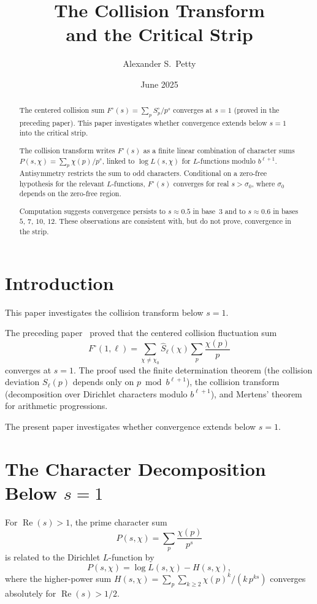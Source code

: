 \documentclass[12pt]{amsart}
\title{The Collision Transform\\and the Critical Strip}
\author{Alexander S.\ Petty}
\date{June 2025}
\theoremstyle{definition}
\theoremstyle{remark}
\begin{document}
\begin{abstract}
The centered collision sum
$F^{\circ}(s) = \sum_p S^{\circ}_p / p^s$
converges at $s = 1$ (proved in the preceding paper).
This paper investigates whether convergence extends
below $s = 1$ into the critical strip.

The collision transform writes $F^{\circ}(s)$ as a
finite linear combination of character sums
$P(s, \chi) = \sum_p \chi(p)/p^s$, linked to
$\log L(s, \chi)$ for $L$-functions modulo
$b^{\ell+1}$. Antisymmetry restricts the sum to odd
characters. Conditional on a zero-free hypothesis for
the relevant $L$-functions, $F^{\circ}(s)$ converges
for real $s > \sigma_0$, where $\sigma_0$ depends on
the zero-free region.

Computation suggests convergence persists to
$s \approx 0.5$ in base~$3$ and to $s \approx 0.6$
in bases $5$, $7$, $10$, $12$. These observations
are consistent with, but do not prove, convergence
in the strip.
\end{abstract}
\maketitle

\section{Introduction}

This paper investigates the collision transform below $s = 1$.

The preceding paper~\cite{paper16} proved that the centered
collision fluctuation sum
\[
F^{\circ}(1, \ell)
= \sum_{\chi \ne \chi_0}
\hat{S}_{\ell}(\chi) \sum_p \frac{\chi(p)}{p}
\]
converges at $s = 1$. The proof used the finite determination
theorem (the collision deviation $S_{\ell}(p)$ depends only on
$p \bmod b^{\ell+1}$), the collision transform (decomposition
over Dirichlet characters modulo $b^{\ell+1}$), and Mertens'
theorem for arithmetic progressions.

The present paper investigates whether convergence extends
below $s = 1$.

\section{The Character Decomposition Below $s = 1$}

For $\operatorname{Re}(s) > 1$, the prime character
sum~\cite{davenport,iwaniec-kowalski}
\[
P(s, \chi) = \sum_p \frac{\chi(p)}{p^s}
\]
is related to the Dirichlet $L$-function by
\begin{equation}\label{eq:P-and-L}
P(s, \chi) = \log L(s, \chi) - H(s, \chi),
\end{equation}
where the higher-power sum
$H(s,\chi) = \sum_p \sum_{k\ge2} \chi(p)^k/(k\,p^{ks})$
converges absolutely for $\operatorname{Re}(s)>1/2$.
\end{document}

